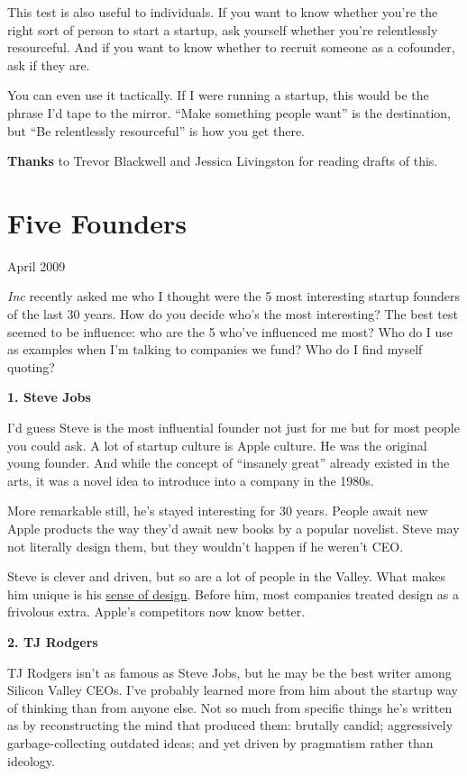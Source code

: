 \documentclass[12pt]{book}
\begin{document}
This test is also useful to individuals. If you want to know whether
you're the right sort of person to start a startup, ask yourself whether
you're relentlessly resourceful. And if you want to know whether to
recruit someone as a cofounder, ask if they are.

You can even use it tactically. If I were running a startup, this would
be the phrase I'd tape to the mirror. ``Make something people want'' is
the destination, but ``Be relentlessly resourceful'' is how you get
there.


\textbf{Thanks} to Trevor Blackwell and Jessica Livingston for reading
drafts of this.
\chapter{Five Founders}

April 2009

\emph{Inc} recently asked me who I thought were the 5 most interesting
startup founders of the last 30 years. How do you decide who's the most
interesting? The best test seemed to be influence: who are the 5 who've
influenced me most? Who do I use as examples when I'm talking to
companies we fund? Who do I find myself quoting?

\textbf{1. Steve Jobs}

I'd guess Steve is the most influential founder not just for me but for
most people you could ask. A lot of startup culture is Apple culture. He
was the original young founder. And while the concept of ``insanely
great'' already existed in the arts, it was a novel idea to introduce
into a company in the 1980s.

More remarkable still, he's stayed interesting for 30 years. People
await new Apple products the way they'd await new books by a popular
novelist. Steve may not literally design them, but they wouldn't happen
if he weren't CEO.

Steve is clever and driven, but so are a lot of people in the Valley.
What makes him unique is his \href{taste.html}{sense of design}. Before
him, most companies treated design as a frivolous extra. Apple's
competitors now know better.

\textbf{2. TJ Rodgers}

TJ Rodgers isn't as famous as Steve Jobs, but he may be the best writer
among Silicon Valley CEOs. I've probably learned more from him about the
startup way of thinking than from anyone else. Not so much from specific
things he's written as by reconstructing the mind that produced them:
brutally candid; aggressively garbage-collecting outdated ideas; and yet
driven by pragmatism rather than ideology.
\end{document}
